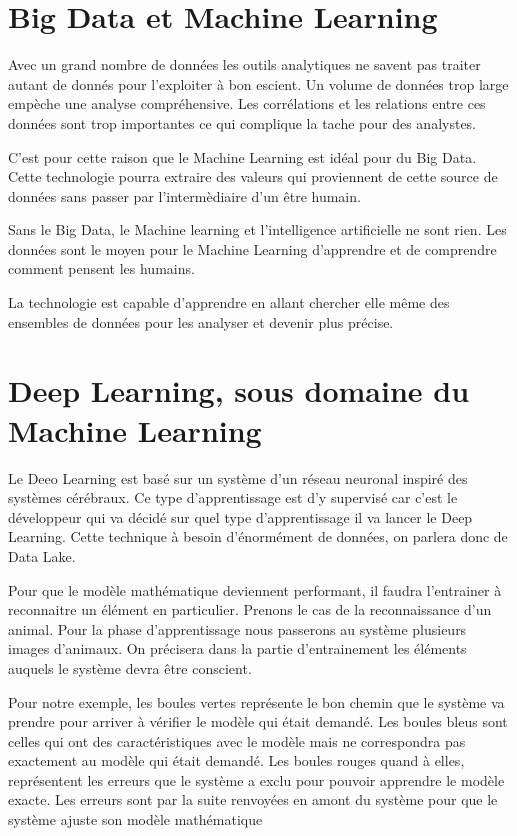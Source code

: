 \documentclass[12pt,a4paper]{report}
\begin{document}
\section{Big Data et Machine Learning}

Avec un grand nombre de données les outils analytiques ne savent pas traiter autant de donnés pour l'exploiter à bon escient. Un volume de données trop large empèche une analyse compréhensive. Les corrélations et les relations entre ces données sont trop importantes ce qui complique la tache pour des analystes. 

C'est pour cette raison que le Machine Learning est idéal pour du Big Data. Cette technologie pourra extraire des valeurs qui proviennent de cette source de données sans passer par l'intermèdiaire d'un être humain.

Sans le Big Data, le Machine learning et l'intelligence artificielle ne sont rien. Les données sont le moyen pour le Machine Learning d'apprendre et de comprendre comment pensent les humains. 

La technologie est capable d'apprendre en allant chercher elle même des ensembles de données pour les analyser et devenir plus précise.

\section{Deep Learning, sous domaine du Machine Learning}

Le Deeo Learning est basé sur un système d'un réseau neuronal inspiré des systèmes cérébraux. Ce type d'apprentissage est d'y supervisé car c'est le développeur qui va décidé sur quel type d'apprentissage il va lancer le Deep Learning. Cette technique à besoin d'énormément de données, on parlera donc de Data Lake. 

Pour que le modèle mathématique deviennent performant, il faudra l'entrainer à reconnaitre un élément en particulier. Prenons le cas de la reconnaissance d'un animal. Pour la phase d'apprentissage nous passerons au système plusieurs images d'animaux. On précisera dans la partie d'entrainement les éléments auquels le système devra être conscient.
\pagebreak

Pour notre exemple, les boules vertes représente le bon chemin que le système va prendre pour arriver à vérifier le modèle qui était demandé. Les boules bleus sont celles qui ont des caractéristiques avec le modèle mais ne correspondra pas exactement au modèle qui était demandé. Les boules rouges quand à elles, représentent les erreurs que le système a exclu pour pouvoir apprendre le modèle exacte. Les erreurs sont par la suite renvoyées en amont du système pour que le système ajuste son modèle mathématique
\end{document}
